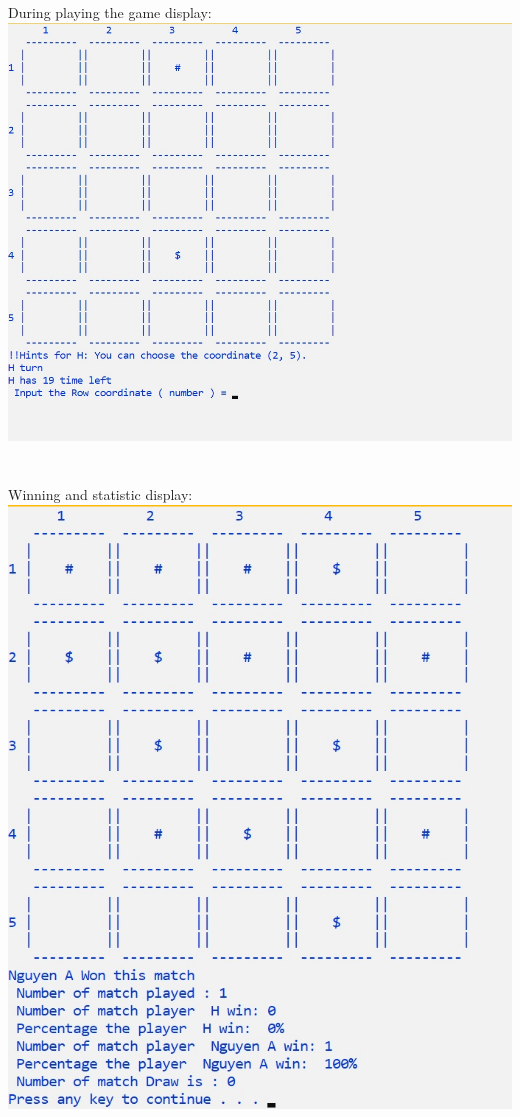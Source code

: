 \documentclass[12pt,a4paper]{article}
\begin{document}
During playing the game display: \\ 
\includegraphics[scale=0.7]{picture/Playing.jpg}\\ \\ \\
Winning and statistic display: \\
\includegraphics[scale=0.7]{picture/Winning.jpg}\\ \\ \\ \\ \\ \\ \\
\end{document}
